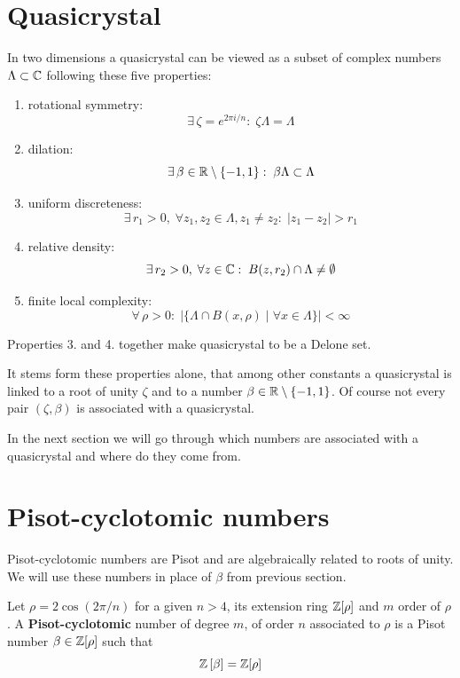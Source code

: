 \documentclass[text.tex]{subfiles}
\begin{document}
\section{Quasicrystal}\label{sec_quasicrystalEaseIn}%
In two dimensions a quasicrystal can be viewed as a subset of complex numbers $\Lambda\subset\mathbb{C}$ following these five properties:

\begin{enumerate}
\item rotational symmetry: $$\exists\,\zeta = e^{2\pi i/n}:\; \zeta\Lambda = \Lambda$$
\item dilation: $$\exists\,\beta\in\mathbb{R}\setminus\{-1,1\}:\; \beta\Lambda\subset \Lambda$$
\item uniform discreteness: $$\exists\,r_1>0,\; \forall z_1,z_2\in\Lambda, z_1\neq z_2:\; |z_1-z_2|>r_1$$
\item relative density: $$\exists\,r_2>0,\; \forall z\in\mathbb{C}:\; B(z,r_2)\cap\Lambda \neq \emptyset$$
\item finite local complexity: $$\forall\,\rho>0:\;\big|\{\Lambda\cap B(x,\rho)\;|\;\forall x\in\Lambda\}\big| < \infty$$
\end{enumerate}

\begin{remark}
Properties 3. and 4. together make quasicrystal to be a Delone set.
\end{remark}

It stems form these properties alone, that among other constants a quasicrystal is linked to a root of unity $\zeta$ and to a number $\beta\in\mathbb{R}\setminus\{-1,1\}$. Of course not every pair $(\zeta, \beta)$ is associated with a quasicrystal.

In the next section we will go through which numbers are associated with a quasicrystal and where do they come from. 

\section{Pisot-cyclotomic numbers}\label{sec_pisotCyclotomic}%
Pisot-cyclotomic numbers are Pisot and are algebraically related to roots of unity. We will use these numbers in place of $\beta$ from previous section. 

\begin{definition}\label{def_pisotCyclotomic}
Let $\rho = 2\cos\left(2\pi/n\right)$ for a given $n>4$, its extension ring $\mathbb{Z}[\rho]$ and $m$ order of $\rho$. A \textbf{Pisot-cyclotomic} number of degree $m$, of order $n$ associated to $\rho$ is a Pisot number $\beta \in \mathbb{Z}[\rho]$ such that
$$\mathbb{Z}\left[\beta\right] = \mathbb{Z}[\rho]$$
\end{definition}
\end{document}
